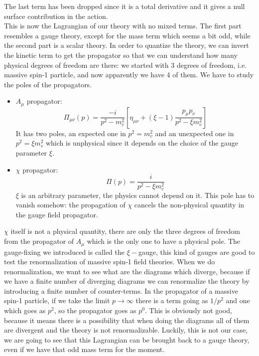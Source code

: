\documentclass[../main.tex]{subfiles}
\begin{document}
The last term has been dropped since it is a total derivative and it gives a null surface contribution in the action.\\
This is now the Lagrangian of our theory with no mixed terms. The first part resembles a gauge theory, except for the mass term which seems a bit odd, while the second part is a scalar theory. In order to quantize the theory, we can invert the kinetic term to get the propagator so that we can understand how many physical degrees of freedom are there: we started with 3 degrees of freedom, i.e. massive spin-1 particle, and now apparently we have 4 of them. We have to study the poles of the propagators.
\begin{itemize}
    \item $A_\mu$ propagator:
    \[
    \Pi_{\mu\nu}(p)=\frac{-i}{p^2-m_v^2}\left[\eta_{\mu\nu}+(\xi-1)\frac{p_\mu p_\nu}{p^2-\xi m_v^2}\right]
    \]
    It has two poles, an expected one in $p^2=m_v^2$ and an unexpected one in $p^2=\xi m_v^2$ which is unphysical since it depends on the choice of the gauge parameter $\xi$.
    \item $\chi$ propagator:
    \[
    \Pi(p)=\frac{i}{p^2-\xi m_v^2}
    \]
    $\xi$ is an arbitrary parameter, the physics cannot depend on it. This pole has to vanish somehow: the propagation of $\chi$ cancels the non-physical quantity in the gauge field propagator. 
\end{itemize}
$\chi$ itself is not a physical quantity, there are only the three degrees of freedom from the propagator of $A_\mu$ which is the only one to have a physical pole.
The gauge-fixing we introduced is called the $\xi-$gauge, this kind of gauges are good to test the renormalization of massive spin-1 field theories. When we do renormalization, we want to see what are the diagrams which diverge, because if we have a finite number of diverging diagrams we can renormalize the theory by introducing a finite number of counter-terms. In the propagator of a massive spin-1 particle, if we take the limit $p\to\infty$ there is a term going as $1/p^2$ and one which goes as $p^2$, so the propagator goes as $p^0$. This is obviously not good, because it means there is a possibility that when doing the diagrams all of them are divergent and the theory is not renormalizable. Luckily, this is not our case, we are going to see that this Lagrangian can be brought back to a gauge theory, even if we have that odd mass term for the moment.\\
\end{document}
